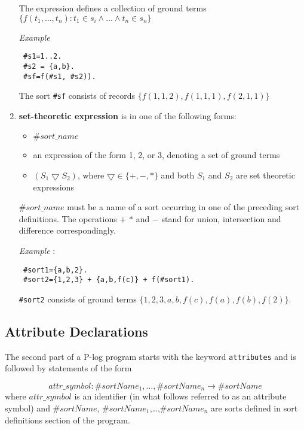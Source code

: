 \documentclass[12pt, letterpaper]{article}
\begin{document}
\begin{enumerate}
The expression defines a collection of ground terms 
\\ $\{f(t_1,\dots,t_n):  t_1 \in s_i \land \dots \land t_n \in s_n\}$

\textit{Example}
\begin{verbatim}
 #s1=1..2.
 #s2 = {a,b}.
 #sf=f(#s1, #s2)). 
\end{verbatim}

The sort \texttt{\#sf} consists of records $\{f(1,1,2),f(1,1,1),f(2,1,1)\}$



 \item\label{setexpr} \textbf{set-theoretic expression} is in one of the following forms:
\begin{itemize}
\item $\#sort\_name$  
\item an expression of the form 1, 2, or 3, denoting a set of ground terms
\item $(S_1 \bigtriangledown S_2)$, where $\bigtriangledown \in \{+,-,*\}$ and both $S_1$ and $S_2$ are set theoretic expressions
\end{itemize}

$\#sort\_name$ must be a name of a sort occurring in one of the preceding sort definitions. 
The operations $+$ $*$ and $-$ stand for union, intersection and difference correspondingly.


\textit{Example} : 
\begin{verbatim}
 #sort1={a,b,2}.
 #sort2={1,2,3} + {a,b,f(c)} + f(#sort1).
\end{verbatim}
 \texttt{\#sort2} consists of ground terms $\{1,2,3,a,b,f(c),f(a),f(b),f(2)\}$.

\end{enumerate}

\subsection{Attribute Declarations}

\noindent  The second part of a  P-log program starts with the keyword \texttt{attributes}
and is followed by statements of the form

\begin{equation*}
attr\_symbol : \#sortName_1,\dots,\#sortName_n \rightarrow \#sortName  
\end{equation*}
where $attr\_symbol$ is an identifier (in what follows referred to as an attribute symbol) and
$\#sortName$, $\#sortName_1$,\dots,$\#sortName_n$ are sorts defined in sort definitions section of the program.
\end{document}
